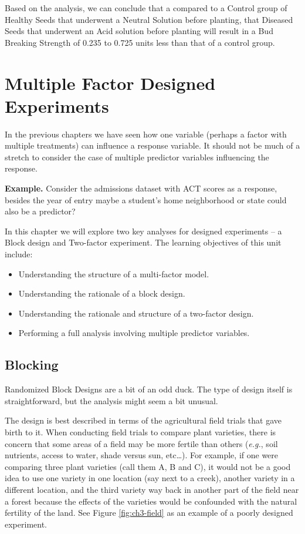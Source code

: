 \documentclass[
]{book}
\providecommand{\tightlist}{%
  \setlength{\itemsep}{0pt}\setlength{\parskip}{0pt}}
\begin{document}
Based on the analysis, we can conclude that a compared to a Control group of Healthy Seeds that underwent a Neutral Solution before planting, that Diseased Seeds that underwent an Acid solution before planting will result in a Bud Breaking Strength of 0.235 to 0.725 units less than that of a control group.

\hypertarget{multiple-factor-designed-experiments}{%
\chapter{Multiple Factor Designed Experiments}\label{multiple-factor-designed-experiments}}

In the previous chapters we have seen how one variable (perhaps a factor with multiple treatments) can influence a response variable.
It should not be much of a stretch to consider the case of multiple predictor variables influencing the response.

\textbf{Example.} Consider the admissions dataset with ACT scores as a response, besides the year of entry maybe a student's home neighborhood or state could also be a predictor?

In this chapter we will explore two key analyses for designed experiments -- a Block design and Two-factor experiment.
The learning objectives of this unit include:

\begin{itemize}
\tightlist
\item
  Understanding the structure of a multi-factor model.
\item
  Understanding the rationale of a block design.
\item
  Understanding the rationale and structure of a two-factor design.
\item
  Performing a full analysis involving multiple predictor variables.
\end{itemize}

\hypertarget{blocking}{%
\section{Blocking}\label{blocking}}

Randomized Block Designs are a bit of an odd duck.
The type of design itself is straightforward, but the analysis might seem a bit unusual.

The design is best described in terms of the agricultural field trials that gave birth to it.
When conducting field trials to compare plant varieties, there is concern that some areas of a field may be more fertile than others (\emph{e.g.}, soil nutrients, access to water, shade versus sun, etc\ldots).
For example, if one were comparing three plant varieties (call them A, B and C), it would not be a good idea to use one variety in one location (say next to a creek), another variety in a different location, and the third variety way back in another part of the field near a forest because the effects of the varieties would be confounded with the natural fertility of the land.
See Figure \ref{fig:ch3-field} as an example of a poorly designed experiment.
\end{document}
